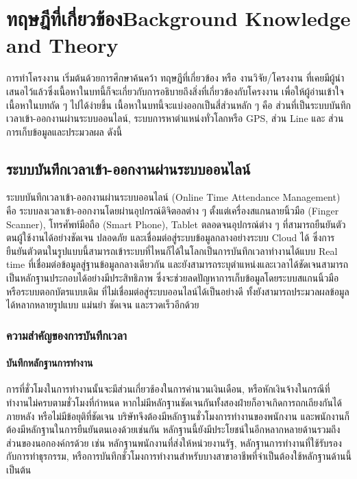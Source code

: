 \chapter{\ifcpe ทฤษฎีที่เกี่ยวข้อง\else Background Knowledge and Theory\fi}

\quad การทำโครงงาน เริ่มต้นด้วยการศึกษาค้นคว้า ทฤษฎีที่เกี่ยวข้อง หรือ งานวิจัย/โครงงาน ที่เคยมีผู้นําเสนอไว้แล้วซึ่งเนื้อหาในบทนี้ก็จะเกี่ยวกับการอธิบายถึงสิ่งที่เกี่ยวข้องกับโครงงาน เพื่อให้ผู้อ่านเข้าใจเนื้อหาในบทถัด ๆ ไปได้ง่ายขึ้น เนื้อหาในบทนี้จะแบ่งออกเป็นสี่ส่วนหลัก ๆ คือ ส่วนที่เป็นระบบบันทึกเวลาเข้า-ออกงานผ่านระบบออนไลน์, ระบบการหาตำแหน่งทั่วโลกหรือ GPS, ส่วน Line และ ส่วนการเก็บข้อมูลและประมวลผล ดังนี้ 

\section{ระบบบันทึกเวลาเข้า-ออกงานผ่านระบบออนไลน์}
\quad ระบบบันทึกเวลาเข้า-ออกงานผ่านระบบออนไลน์ (Online Time Attendance Management) คือ ระบบลงเวลาเข้า-ออกงานโดยผ่านอุปกรณ์ดิจิตอลต่าง ๆ ตั้งแต่เครื่องสแกนลายนิ้วมือ (Finger Scanner), โทรศัพท์มือถือ (Smart Phone), Tablet ตลอดจนอุปกรณ์ต่าง ๆ ที่สามารถยืนยันตัวตนผู้ใช้งานได้อย่างชัดเจน ปลอดภัย และเชื่อมต่อสู่ระบบข้อมูลกลางอย่างระบบ Cloud ได้ ซึ่งการยืนยันตัวตนในรูปแบบนี้สามารถเข้าระบบที่ไหนก็ได้ในโลกเป็นการบันทึกเวลาทำงานได้แบบ Real time ที่เชื่อมต่อข้อมูลสู่ฐานข้อมูลกลางเดียวกัน และยังสามารถระบุตำแหน่งและเวลาได้ชัดเจนสามารถเป็นหลักฐานประกอบได้อย่างมีประสิทธิภาพ ซึ่งจะช่วยลดปัญหาการเก็บข้อมูลโดยระบบสแกนนิ้วมือหรือระบบตอกบัตรแบบเดิม ที่ไม่เชื่อมต่อสู่ระบบออนไลน์ได้เป็นอย่างดี ทั้งยังสามารถประมวลผลข้อมูลได้หลากหลายรูปแบบ แม่นยํา ชัดเจน และรวดเร็วอีกด้วย

\subsection{ความสำคัญของการบันทึกเวลา}
\subsubsection{บันทึกหลักฐานการทำงาน}
\quad การที่ชั่วโมงในการทำงานนั้นจะมีส่วนเกี่ยวช้องในการคำนวนเงินเดือน, หรือหักเงินจ้างในกรณีที่ทำงานไม่ครบตามชั่วโมงที่กำหนด 
หากไม่มีหลักฐานชัดเจนกันทั้งสองฝ่ายก็อาจเกิดการถกเถียงกันได้ภายหลัง หรือไม่มีข้อยุติที่ชัดเจน บริษัทจึงต้องมีหลักฐานชั่วโมงการทำงานของพนักงาน และพนักงานก็ต้องมีหลักฐานในการยืนยันตนเองด้วยเช่นกัน
หลักฐานนี้ยังมีประโยชน์ในอีกหลากหลายด้านรวมถึงส่วนของนอกองค์กรด้วย เช่น 
หลักฐานพนักงานที่ส่งให้หน่วยงานรัฐ, หลักฐานการทำงานที่ใช้รับรองกับการทำธุรกรรม, หรือการบันทึกชั่วโมงการทำงานสำหรับบางสาขาอาชีพที่จำเป็นต้องใช้หลักฐานด้านนี้ เป็นต้น 
